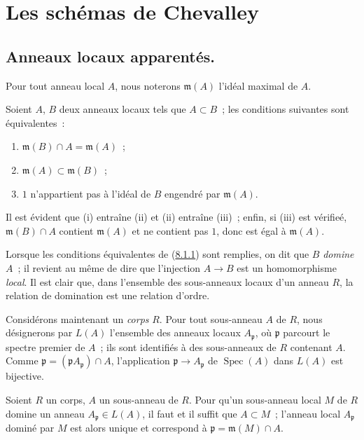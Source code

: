 \section{Les schémas de Chevalley}
\label{section:I.8-fr}

\subsection{Anneaux locaux apparentés.}
\label{subsection:I.8.1-fr}

Pour tout anneau local $A$, nous noterons $\mathfrak m(A)$ l'idéal maximal de
$A$.

\begin{lemma}[8.1.1]
\label{I.8.1.1-fr}
Soient $A$, $B$ deux anneaux locaux tels que $A\subset B$~; les conditions
suivantes sont équivalentes~:
\begin{enumerate}
  \item[\textup{(i)}] $\mathfrak m(B)\cap A=\mathfrak m(A)$~;
  \item[\textup{(ii)}] $\mathfrak m(A)\subset\mathfrak m(B)$~;
  \item[\textup{(iii)}] $1$ n'appartient pas à l'idéal de $B$ engendré par
    $\mathfrak m(A)$.
\end{enumerate}
\end{lemma}

Il est évident que (i) entraîne (ii) et (ii) entraîne (iii)~; enfin, si (iii)
est vérifieé, $\mathfrak m(B)\cap A$ contient $\mathfrak m(A)$ et ne contient
pas $1$, donc est égal à $\mathfrak m(A)$.

Lorsque les conditions équivalentes de
(\hyperref[I.8.1.1-fr]{8.1.1}) sont remplies, on dit que $B$ \emph{domine}
$A$~; il revient au même de dire que l'injection $A\to B$ est un
homomorphisme \emph{local}. Il est clair que, dans l'ensemble des sous-anneaux
locaux d'un anneau $R$, la relation de domination est une relation d'ordre.

\begin{env}[8.1.2]
\label{I.8.1.2-fr}
Considérons maintenant un \emph{corps} $R$. Pour tout sous-anneau $A$ de $R$,
nous désignerons par $L(A)$ l'ensemble des anneaux locaux $A_\mathfrak p$, où
$\mathfrak p$ parcourt le spectre premier de $A$~; ils sont identifiés à des
sous-anneaux de $R$ contenant $A$. Comme
$\mathfrak p=(\mathfrak p A_\mathfrak p)\cap A$, l'application
$\mathfrak p\to A_\mathfrak p$ de $\operatorname{Spec}(A)$ dans $L(A)$
est bijective.
\end{env}

\begin{lemma}[8.1.3]
\label{I.8.1.3-fr}
Soient $R$ un corps, $A$ un sous-anneau de $R$. Pour qu'un sous-anneau local
$M$ de $R$ domine un anneau $A_\mathfrak p\in L(A)$, il faut et il suffit que
$A\subset M$~; l'anneau local $A_\mathfrak p$ dominé par $M$ est alors unique
et correspond à $\mathfrak p=\mathfrak m(M)\cap A$.
\end{lemma}


